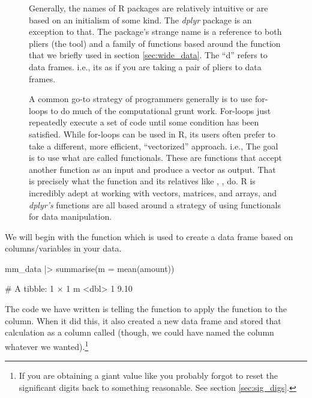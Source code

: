 \begin{figure}[h]
    \centering
\begin{mdframed}[style = miscFrame, frametitle = Box 3.1: Why is it called \textit{dplyr}?]

Generally, the names of R packages are relatively intuitive or are based on an initialism of some kind. The \textit{dplyr} package is an exception to that. The package's strange name is a reference to both pliers (the tool) and a family of functions based around the  function that we briefly used in section \ref{sec:wide_data}. The ``d'' refers to data frames. i.e., its as if you are taking a pair of pliers to data frames.

\vspace{1em}

A common go-to strategy of programmers generally is to use for-loops to do much of the computational grunt work. For-loops just repeatedly execute a set of code until some condition has been satisfied. While for-loops can be used in R, its users often prefer to take a different, more efficient, ``vectorized'' approach. i.e., The goal is to use what are called \glspl{functional}. These are functions that accept another function as an input and produce a vector as output. That is precisely what the  function and its relatives like , ,  do. R is incredibly adept at working with vectors, matrices, and arrays, and \textit{dplyr's} functions are all based around a strategy of using functionals for data manipulation.

\end{mdframed}
\end{figure}

We will begin with the  function which is used to create a data frame based on columns/variables in your data.

\begin{inR}
mm_data |> 
  summarise(m = mean(amount))
\end{inR}

\begin{outR}
# A tibble: 1 × 1
      m
  <dbl>
1  9.10
\end{outR}

The code we have written is telling the  function to apply the  function to the  column. When it did this, it also created a new data frame and stored that calculation as a column called  (though, we could have named the column whatever we wanted).\footnote{If you are obtaining a giant value like  you probably forgot to reset the significant digits back to something reasonable. See section \ref{sec:sig_digs}.}

